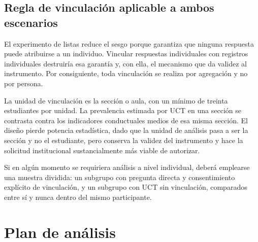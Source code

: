 \documentclass[11pt,a4paper]{article}
\begin{document}
\subsection{Regla de vinculación aplicable a ambos escenarios}
\label{sec:vinculacion}

El experimento de listas reduce el sesgo porque garantiza que ninguna respuesta puede atribuirse a un individuo. Vincular respuestas individuales con registros individuales destruiría esa garantía y, con ella, el mecanismo que da validez al instrumento. Por consiguiente, toda vinculación se realiza por agregación y no por persona.

La unidad de vinculación es la sección o aula, con un mínimo de treinta estudiantes por unidad. La prevalencia estimada por UCT en una sección se contrasta contra los indicadores conductuales medios de esa misma sección. El diseño pierde potencia estadística, dado que la unidad de análisis pasa a ser la sección y no el estudiante, pero conserva la validez del instrumento y hace la solicitud institucional sustancialmente más viable de autorizar.

Si en algún momento se requiriera análisis a nivel individual, deberá emplearse una muestra dividida: un subgrupo con pregunta directa y consentimiento explícito de vinculación, y un subgrupo con UCT sin vinculación, comparados entre sí y nunca dentro del mismo participante.

\section{Plan de análisis}
\end{document}
